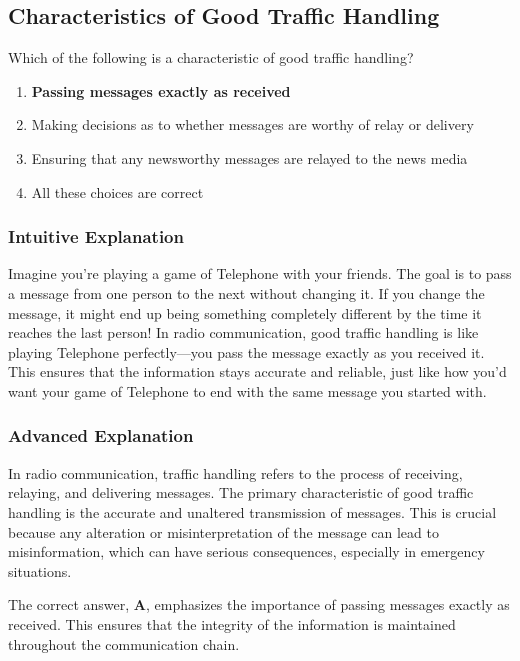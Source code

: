 \subsection{Characteristics of Good Traffic Handling}
\label{T2C08}

\begin{tcolorbox}[colback=gray!10!white,colframe=black!75!black,title=T2C08]
Which of the following is a characteristic of good traffic handling?
\begin{enumerate}[label=\Alph*)]
    \item \textbf{Passing messages exactly as received}
    \item Making decisions as to whether messages are worthy of relay or delivery
    \item Ensuring that any newsworthy messages are relayed to the news media
    \item All these choices are correct
\end{enumerate}
\end{tcolorbox}

\subsubsection{Intuitive Explanation}
Imagine you're playing a game of Telephone with your friends. The goal is to pass a message from one person to the next without changing it. If you change the message, it might end up being something completely different by the time it reaches the last person! In radio communication, good traffic handling is like playing Telephone perfectly—you pass the message exactly as you received it. This ensures that the information stays accurate and reliable, just like how you'd want your game of Telephone to end with the same message you started with.

\subsubsection{Advanced Explanation}
In radio communication, traffic handling refers to the process of receiving, relaying, and delivering messages. The primary characteristic of good traffic handling is the accurate and unaltered transmission of messages. This is crucial because any alteration or misinterpretation of the message can lead to misinformation, which can have serious consequences, especially in emergency situations.

The correct answer, \textbf{A}, emphasizes the importance of passing messages exactly as received. This ensures that the integrity of the information is maintained throughout the communication chain. 

